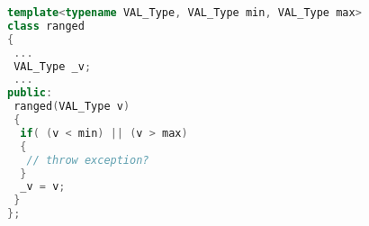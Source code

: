\begin{lstlisting}[caption={%
\emblink{\#lst--range--\thelstlisting.pgvm-pdf}{Templated Range Constructor}},
  language = C++, numbers = none, escapechar = !,label={lst:range},
    basicstyle = \ttfamily\bfseries\footnotesize, linewidth = \linewidth]
template<typename VAL_Type, VAL_Type min, VAL_Type max>
class ranged
{
 ...
 VAL_Type _v;
 ...
public:
 ranged(VAL_Type v)
 {
  if( (v < min) || (v > max)
  {
   // throw exception?
  }
  _v = v;
 }
};
\end{lstlisting}

\vspace{-2em}
